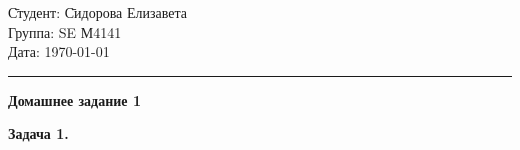 \documentclass[oneside,final,14pt]{extreport}
\begin{document}
\begin{tabbing}
\hspace{11cm} \= Студент: \= Сидорова Елизавета\\
  \> Группа: \> SE М4141\\
  \> Дата: \> \today
\end{tabbing}
\hrule
\vspace{1cm}



\begin{center}{\bfseries Домашнее задание 1 \mdseries}\end{center}

\bigskip
\noindent \bfseries Задача 1. \mdseries
\bigskip

\end{document}
